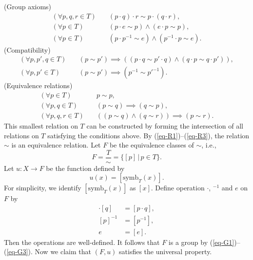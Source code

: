 \noindent(Group axioms)
\begin{align}
	(\forall p, q, r \in T) \quad &(p \cdot q) \cdot r \sim p \cdot (q \cdot r),  \label{eq-G1} \tag{G1}\\
	(\forall p \in T) \quad &(p \cdot e \sim p) \land (e \cdot p \sim p), \tag{G2}\\
	(\forall p \in T) \quad &(p \cdot p^{-1} \sim e) \land (p^{-1} \cdot p \sim e).  \label{eq-G3}\tag{G3}
\end{align}
(Compatibility)
\begin{align}
	(\forall p, p', q \in T) \quad &(p \sim p') \implies ((p \cdot q \sim p' \cdot q) \land (q \cdot p \sim q \cdot p')), \label{eq-C1}\tag{C1}
	\\
	(\forall p,p'\in T) \quad &(p\sim p') \implies (p^{-1} \sim p'^{-1}). \label{eq-C2}\tag{C2}
\end{align}
(Equivalence relations)
\begin{align}
	(\forall p \in T) \quad &p \sim p, \label{eq-R1} \tag{R1} \\
	(\forall p, q \in T) \quad &(p \sim q) \implies (q \sim p), \tag{R2}\\
	(\forall p, q, r \in T) \quad &((p \sim q) \land (q \sim r)) \implies (p \sim r).\label{eq-R3} \tag{R3}
\end{align}
This smallest relation on $T$ can be constructed by forming the intersection of all relations on $T$ satisfying the conditions above. By (\ref{eq-R1})--(\ref{eq-R3}), the relation $\sim$ is an equivalence relation. Let $F$ be the equivalence classes of $\sim$, i.e.,
\begin{equation*}
	F = \frac{T}{\sim} =\{[p]\,|\, p\in T\}.
\end{equation*}
Let $u:X\rightarrow F$ be the function defined by
\begin{equation*}
	u(x) = [\text{symb}_T(x)].
\end{equation*}
For simplicity, we identify $[\text{symb}_T(x)]$ as $[x]$. Define operation $\cdot$, ${}^{-1}$ and $e$ on $F$ by
\begin{align*}
	[p]\cdot [q] &= [p\cdot q],
	\\
	[p]^{-1} &= [p^{-1}],
	\\
	e&= [e].
\end{align*}
Then the operations are well-defined. It follows that $F$ is a group by (\ref{eq-G1})--(\ref{eq-G3}). Now we claim that $(F,u)$ satisfies the universal property.

